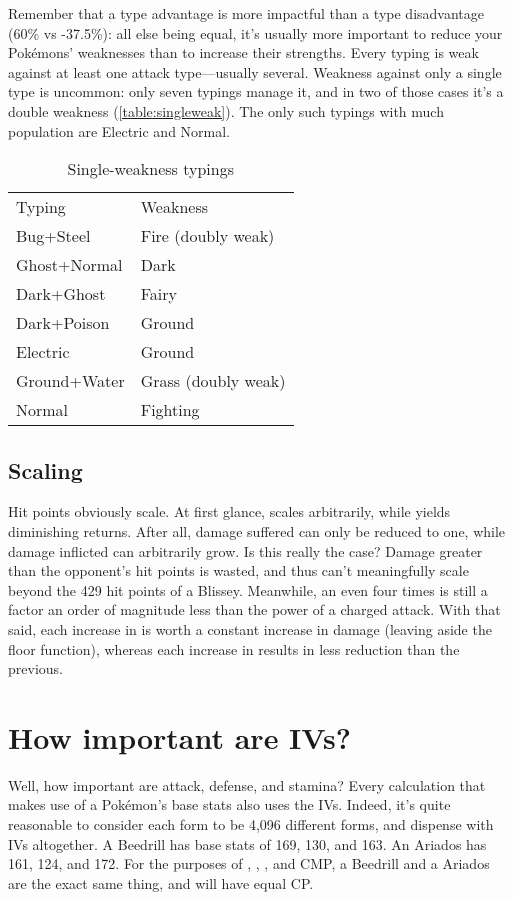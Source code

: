 Remember that a type advantage is more impactful than a type
  disadvantage (60\% vs -37.5\%):
  all else being equal, it's usually more important to reduce your Pokémons'
  weaknesses than to increase their strengths.
Every typing is weak against at least one attack type---usually several.
Weakness against only a single type is uncommon: only seven typings manage it, and in two
 of those cases it's a double weakness (\autoref{table:singleweak}).
The only such typings with much population are Electric and Normal. 
\begin{table}[ht]
\centering
\begin{tabular}{ll}
Typing & Weakness\\
\Midrule
Bug+Steel & Fire (doubly weak) \\
Ghost+Normal & Dark \\
Dark+Ghost & Fairy \\
Dark+Poison & Ground \\
Electric & Ground \\
Ground+Water & Grass (doubly weak) \\
Normal & Fighting \\
\end{tabular}
  \caption{Single-weakness typings\label{table:singleweak}}
\end{table}

\subsection{Scaling\label{subsec:scaling}}
Hit points obviously scale.
At first glance,  scales arbitrarily, while  yields diminishing returns.
After all, damage suffered can only be reduced to one, while damage inflicted
 can arbitrarily grow.
Is this really the case?
Damage greater than the opponent's hit points is wasted, and thus can't meaningfully scale
 beyond the 429 hit points of a  Blissey.
Meanwhile, an  even four times  is still a factor an order of magnitude
 less than the power of a charged attack.
With that said, each increase in  is worth a constant increase in
 damage (leaving aside the floor function), whereas each increase in 
 results in less reduction than the previous.

\section{How important are IVs?}
Well, how important are attack, defense, and stamina?
Every calculation that makes use of a Pokémon's base stats also uses the IVs.
Indeed, it's quite reasonable to consider each form to be 4,096 different forms,
 and dispense with IVs altogether.
A Beedrill has base stats of 169, 130, and 163.
An Ariados has 161, 124, and 172.
For the purposes of , , \MHP, and CMP, a  Beedrill
 and a  Ariados are the exact same thing, and will have equal CP.

